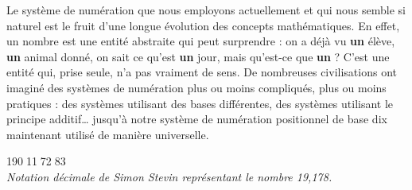 \vspace*{-7mm}
\begin{changemargin}{-15mm}{-15mm} 


\end{changemargin}
\vspace*{-11mm}
\begin{debat}   
   \begin{changemargin}{-15mm}{-15mm}
   Le système de numération que nous employons actuellement et qui nous semble si naturel est le fruit d'une longue évolution des concepts mathématiques. En effet, un nombre est une entité abstraite qui peut surprendre : on a déjà vu {\bf un} élève, {\bf un} animal donné, on sait ce qu'est {\bf un} jour, mais qu'est-ce que {\bf un} ? C'est une entité qui, prise seule, n'a pas vraiment de sens. De nombreuses civilisations ont imaginé des systèmes de numération plus ou moins compliqués, plus ou moins pratiques : des systèmes utilisant des bases différentes, des systèmes utilisant le principe additif\dots{} jusqu'à notre système de numération positionnel de base dix maintenant utilisé de manière universelle.
   \end{changemargin}
   \begin{center}
      \textcolor{B1}{{\huge 19\textcircled{\Large 0}1\textcircled{\Large 1}7\textcircled{\Large2}8\textcircled{\Large 3}} \\
      \it Notation décimale de Simon Stevin représentant le nombre 19,178.}
   \end{center}   
   \begin{cadre}[B2][J4]
      \begin{center}
      \end{center}
   \end{cadre}
\end{debat}